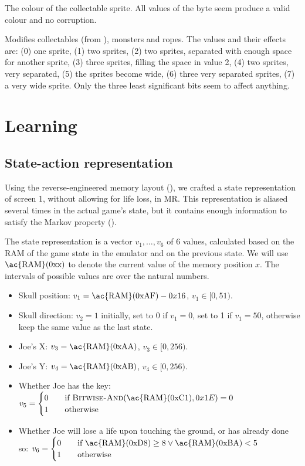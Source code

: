 {\begin{enumerate}
 The colour of the collectable sprite. All values
of the byte seem produce a valid colour and no corruption.

 Modifies collectables (from
\hyperref[ram:collectable]{}), monsters and ropes. The values and their
effects are: (0) one sprite, (1) two sprites, (2) two sprites, separated with enough
space for another sprite, (3) three sprites, filling the space in value 2, (4)
two sprites, very separated, (5) the sprites become wide, (6) three very
separated sprites, (7) a very wide sprite. Only the three least significant bits
seem to affect anything.

\end{enumerate}
}

\section{Learning}
\subsection{State-action representation}
Using the reverse-engineered memory layout (), we
crafted a state representation of screen 1, without allowing for life loss, in
\acl{MR}. This representation is aliased several times in the actual game's
state, but it contains enough information to satisfy the Markov property
().

{
\newcommand{\n}[1]{\text{0x#1}}
\newcommand{\ram}[1]{\text{\ac{RAM}}(\n{#1})}

The state representation is a vector $v_1,\dots,v_6$ of 6 values, calculated
based on the \ac{RAM} of the game state in the emulator and on the previous
state. We will use $\ram{x}$ to denote the current value of the memory position
$x$. The intervals of possible values are over the natural numbers.

\begin{itemize}
  \item Skull position: $v_1 = \ram{AF} - 0x16$, $v_1 \in [0, 51)$.
  \item Skull direction: $v_2 = 1$ initially, set to 0 if $v_1=0$, set to 1 if
    $v_1=50$, otherwise keep the same value as the last state.
  \item Joe's X: $v_3 = \ram{AA}$, $v_3 \in [0, 256)$.
  \item Joe's Y: $v_4 = \ram{AB}$, $v_4 \in [0, 256)$.
  \item Whether Joe has the key: $v_5 =
    \begin{cases}
      0 &\quad\text{if }\textsc{Bitwise-And}(\ram{C1}, 0x1E) = 0 \\
      1 &\quad\text{otherwise}
    \end{cases}$
  \item Whether Joe will lose a life upon touching the ground, or has already
    done so: $v_6 =
    \begin{cases}
      0 &\quad\text{if }\ram{D8} \geq 8 \vee \ram{BA} < 5 \\
      1 &\quad\text{otherwise}
    \end{cases}$
\end{itemize}
}

